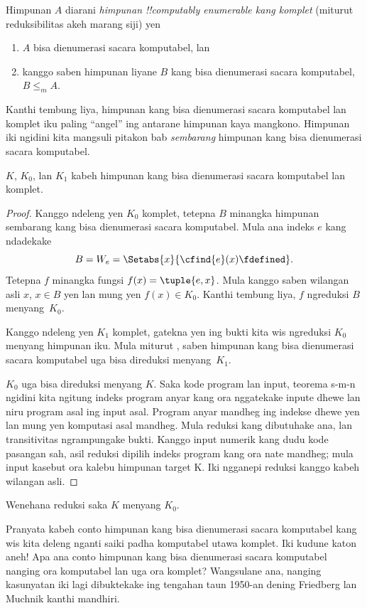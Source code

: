 \documentclass[../../../include/open-logic-section]{subfiles}
\begin{document}

\begin{defn}
Himpunan $A$ diarani \emph{himpunan !!{computably enumerable}
kang komplet} (miturut reduksibilitas akeh marang siji) yen
\begin{enumerate}
\item $A$ bisa dienumerasi sacara komputabel, lan
\item kanggo saben himpunan liyane $B$ kang bisa dienumerasi
  sacara komputabel, $B \leq_m A$.
\end{enumerate}
\end{defn}

Kanthi tembung liya, himpunan kang bisa dienumerasi
sacara komputabel lan komplet iku paling ``angel''
ing antarane himpunan kaya mangkono. Himpunan
iki ngidini kita mangsuli pitakon bab \emph{sembarang}
himpunan kang bisa dienumerasi sacara komputabel.

\begin{thm}
$K$, $K_0$, lan $K_1$ kabeh himpunan kang bisa
dienumerasi sacara komputabel lan komplet.
\end{thm}

\begin{proof}
Kanggo ndeleng yen $K_0$ komplet, tetepna $B$
minangka himpunan sembarang kang bisa dienumerasi
sacara komputabel. Mula ana indeks $e$ kang ndadekake
\[
B = W_e = \Setabs{x}{\cfind{e}(x) \fdefined}.
\]
Tetepna $f$ minangka fungsi $f(x) = \tuple{e, x}$.
Mula kanggo saben wilangan asli $x$, $x \in B$
yen lan mung yen $f(x) \in K_0$.
Kanthi tembung liya, $f$ ngreduksi $B$ menyang~$K_0$.

Kanggo ndeleng yen $K_1$ komplet, gatekna yen
ing bukti  kita wis ngreduksi
$K_0$ menyang himpunan iku. Mula miturut
, saben himpunan kang
bisa dienumerasi sacara komputabel uga bisa
direduksi menyang~$K_1$.

%
$K_0$ uga bisa direduksi menyang $K$.
Saka kode program lan input, teorema s-m-n
ngidini kita ngitung indeks program anyar
kang ora nggatekake inpute dhewe lan
niru program asal ing input asal. Program
anyar mandheg ing indekse dhewe yen lan
mung yen komputasi asal mandheg. Mula
reduksi kang dibutuhake ana, lan
transitivitas ngrampungake bukti. Kanggo input numerik kang dudu kode pasangan sah, asil reduksi dipilih indeks program kang ora nate mandheg; mula input kasebut ora kalebu himpunan target K. Iki ngganepi reduksi kanggo kabeh wilangan asli.
\end{proof}

\begin{prob}
Wenehana reduksi saka $K$ menyang $K_0$.
\end{prob}

\begin{digress}
Pranyata kabeh conto himpunan kang bisa
dienumerasi sacara komputabel kang wis
kita deleng nganti saiki padha komputabel
utawa komplet. Iki kudune katon aneh!{}
Apa ana conto himpunan kang bisa dienumerasi
sacara komputabel nanging ora komputabel
lan uga ora komplet? Wangsulane ana,
nanging kasunyatan iki lagi dibuktekake
ing tengahan taun 1950-an dening Friedberg
lan Muchnik kanthi mandhiri.
\end{digress}
\end{document}
